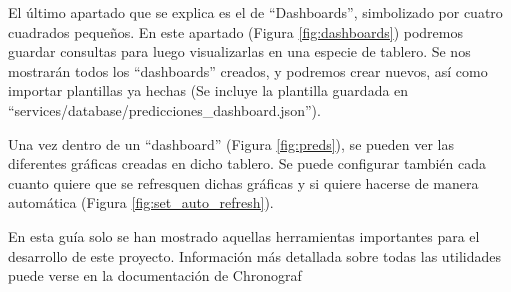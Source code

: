 
El último apartado que se explica es el de ``Dashboards'', simbolizado por cuatro cuadrados pequeños. En este apartado (Figura \ref{fig:dashboards})
podremos guardar consultas para luego visualizarlas en una especie de tablero. Se nos mostrarán todos los ``dashboards'' creados, 
y podremos crear nuevos, así como importar plantillas ya hechas (Se incluye la plantilla guardada en ``services/database/predicciones\_dashboard.json'').


Una vez dentro de un ``dashboard'' (Figura \ref{fig:preds}), se pueden ver las diferentes gráficas creadas en 
dicho tablero. Se puede configurar también cada cuanto quiere que se refresquen dichas gráficas y si quiere hacerse de manera 
automática (Figura \ref{fig:set_auto_refresh}).


En esta guía solo se han mostrado aquellas herramientas importantes para el desarrollo de este proyecto. 
Información más detallada sobre todas las utilidades puede verse en la documentación de Chronograf \cite{chronograf:docs}